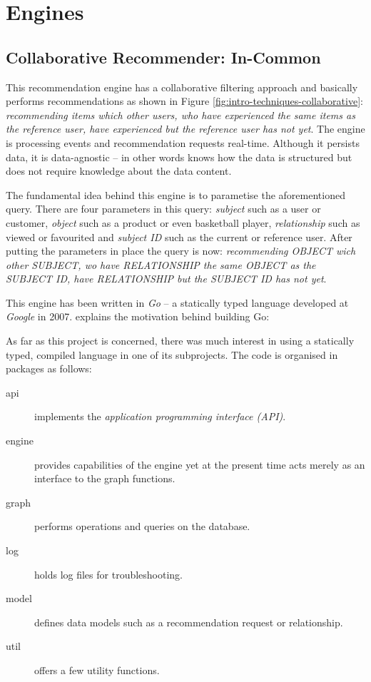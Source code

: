 \section{Engines}

\subsection{Collaborative Recommender: In-Common}

This recommendation engine has a collaborative filtering approach and basically performs recommendations as shown in Figure \ref{fig:intro-techniques-collaborative}: \emph{recommending items which other users, who have experienced the same items as the reference user, have experienced but the reference user has not yet}. The engine is processing events and recommendation requests real-time. Although it persists data, it is data-agnostic -- in other words knows how the data is structured but does not require knowledge about the data content.

The fundamental idea behind this engine is to parametise the aforementioned query. There are four parameters in this query: \emph{subject} such as a user or customer, \emph{object} such as a product or even basketball player, \emph{relationship} such as viewed or favourited and \emph{subject ID} such as the current or reference user. After putting the parameters in place the query is now: \emph{recommending OBJECT wich other SUBJECT, wo have RELATIONSHIP the same OBJECT as the SUBJECT ID, have RELATIONSHIP but the SUBJECT ID has not yet}.

This engine has been written in \emph{Go} -- a statically typed language developed at \emph{Google} in 2007. \citet{pike12} explains the motivation behind building Go:


As far as this project is concerned, there was much interest in using a statically typed, compiled language in one of its subprojects. The code is organised in packages as follows:

\begin{description}
    \item[api] implements the \emph{application programming interface (API)}.
    \item[engine] provides capabilities of the engine yet at the present time acts merely as an interface to the graph functions.
    \item[graph] performs operations and queries on the database.
    \item[log] holds log files for troubleshooting.
    \item[model] defines data models such as a recommendation request or relationship.
    \item[util] offers a few utility functions.
\end{description}

